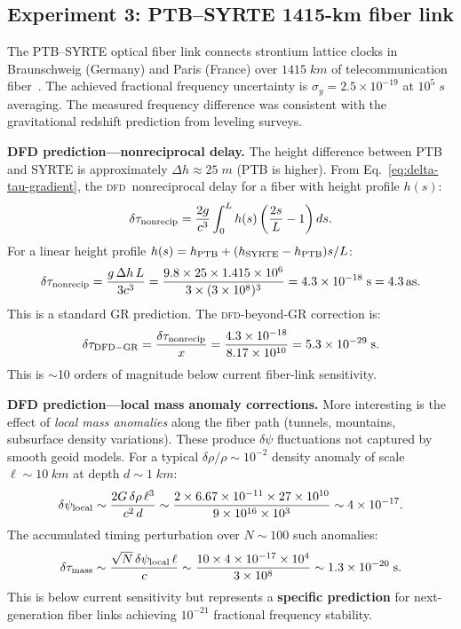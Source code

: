 \documentclass[aps,prd,twocolumn,superscriptaddress,nofootinbib,longbibliography]{revtex4-2}
\newcommand{\DFD}{\textsc{dfd}}
\newcommand{\as}{\,\mathrm{as}}
\begin{document}
\subsection{Experiment 3: PTB--SYRTE 1415-km fiber link}\label{sec:PTB-SYRTE}

The PTB--SYRTE optical fiber link connects strontium lattice clocks
in Braunschweig (Germany) and Paris (France) over $1415\;\si{km}$ of
telecommunication fiber~\cite{Lisdat2016}. The achieved fractional
frequency uncertainty is $\sigma_y = 2.5\times10^{-19}$ at
$10^5\;\si{s}$ averaging. The measured frequency difference was consistent
with the gravitational redshift prediction from leveling surveys.

\textbf{DFD prediction---nonreciprocal delay.} The height difference
between PTB and SYRTE is approximately $\Delta h \approx 25\;\si{m}$
(PTB is higher). From Eq.~\eqref{eq:delta-tau-gradient}, the
\DFD\ nonreciprocal delay for a fiber with height profile $h(s)$:
\begin{equation}
\delta\tau_{\rm nonrecip} = \frac{2g}{c^3}\int_0^L h(s)\left(\frac{2s}{L}-1\right)ds.
\end{equation}
For a linear height profile $h(s) = h_{\rm PTB} + (h_{\rm SYRTE}-h_{\rm PTB})s/L$:
\begin{equation}
\delta\tau_{\rm nonrecip} = \frac{g\,\Delta h\,L}{3c^3}
= \frac{9.8\times 25\times 1.415\times10^6}{3\times(3\times10^8)^3}
= 4.3\times10^{-18}\;\si{s} = 4.3\as.
\end{equation}
This is a standard GR prediction. The \DFD-beyond-GR correction is:
\begin{equation}
\delta\tau_{\rm DFD-GR} = \frac{\delta\tau_{\rm nonrecip}}{x}
= \frac{4.3\times10^{-18}}{8.17\times10^{10}} = 5.3\times10^{-29}\;\si{s}.
\end{equation}
This is $\sim$10 orders of magnitude below current fiber-link sensitivity.

\textbf{DFD prediction---local mass anomaly corrections.} More interesting
is the effect of \emph{local mass anomalies} along the fiber path (tunnels,
mountains, subsurface density variations). These produce $\delta\psi$ fluctuations
not captured by smooth geoid models. For a typical $\delta\rho/\rho \sim 10^{-2}$
density anomaly of scale $\ell \sim 10\;\si{km}$ at depth $d \sim 1\;\si{km}$:
\begin{equation}
\delta\psi_{\rm local} \sim \frac{2G\,\delta\rho\,\ell^3}{c^2\,d}
\sim \frac{2\times6.67\times10^{-11}\times 27\times 10^{10}}{9\times10^{16}\times 10^3}
\sim 4\times10^{-17}.
\end{equation}
The accumulated timing perturbation over $N \sim 100$ such anomalies:
\begin{equation}
\delta\tau_{\rm mass} \sim \frac{\sqrt{N}\,\delta\psi_{\rm local}\,\ell}{c}
\sim \frac{10\times 4\times10^{-17}\times 10^4}{3\times10^8}
\sim 1.3\times10^{-20}\;\si{s}.
\end{equation}
This is below current sensitivity but represents a \textbf{specific
prediction} for next-generation fiber links achieving $10^{-21}$
fractional frequency stability.
\end{document}
